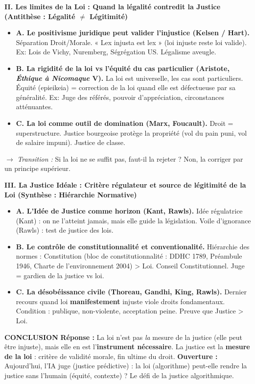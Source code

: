 \documentclass[11pt]{article}
\newcommand{\cle}[1]{{\popxbold\color{popdark}#1}}
\begin{document}
\begin{exoresolu}
\textbf{II. Les limites de la Loi : Quand la légalité contredit la Justice (Antithèse : Légalité $\neq$ Légitimité)}
\begin{itemize}
    \item \textbf{A. Le positivisme juridique peut valider l'injustice (Kelsen / Hart).} Séparation Droit/Morale. « Lex injusta est lex » (loi injuste reste loi valide). Ex: Lois de Vichy, Nuremberg, Ségrégation US. \cle{Légalisme} aveugle.
    \item \textbf{B. La rigidité de la loi vs l'équité du cas particulier (Aristote, \textit{Éthique à Nicomaque} V).} La loi est universelle, les cas sont particuliers. \cle{Équité (epieikeia)} = correction de la loi quand elle est défectueuse par sa généralité. Ex: Juge des référés, pouvoir d'appréciation, circonstances atténuantes.
    \item \textbf{C. La loi comme outil de domination (Marx, Foucault).} Droit = superstructure. Justice bourgeoise protège la propriété (vol du pain puni, vol de salaire impuni). \cle{Justice de classe}.
\end{itemize}
$\rightarrow$ \textit{Transition :} Si la loi ne se suffit pas, faut-il la rejeter ? Non, la corriger par un principe supérieur.

\textbf{III. La Justice Idéale : Critère régulateur et source de légitimité de la Loi (Synthèse : Hiérarchie Normative)}
\begin{itemize}
    \item \textbf{A. L'Idée de Justice comme horizon (Kant, Rawls).} \cle{Idée régulatrice} (Kant) : on ne l'atteint jamais, mais elle guide la législation. \cle{Voile d'ignorance} (Rawls) : test de justice des lois.
    \item \textbf{B. Le contrôle de constitutionnalité et conventionalité.} Hiérarchie des normes : Constitution (bloc de constitutionnalité : DDHC 1789, Préambule 1946, Charte de l'environnement 2004) > Loi. Conseil Constitutionnel. Juge = gardien de la justice vs loi.
    \item \textbf{C. La désobéissance civile (Thoreau, Gandhi, King, Rawls).} Dernier recours quand loi \textbf{manifestement} injuste viole droits fondamentaux. Condition : publique, non-violente, acceptation peine. Preuve que Justice > Loi.
\end{itemize}

\textbf{CONCLUSION}
\textbf{Réponse :} La loi n'est pas \emph{la} mesure de la justice (elle peut être injuste), mais elle en est l'\textbf{instrument nécessaire}. La justice est la \textbf{mesure de la loi} : critère de validité morale, fin ultime du droit.
\textbf{Ouverture :} Aujourd'hui, l'IA juge (justice prédictive) : la loi (algorithme) peut-elle rendre la justice sans l'humain (équité, contexte) ? Le défi de la \cle{justice algorithmique}.
\end{exoresolu}
\end{document}
